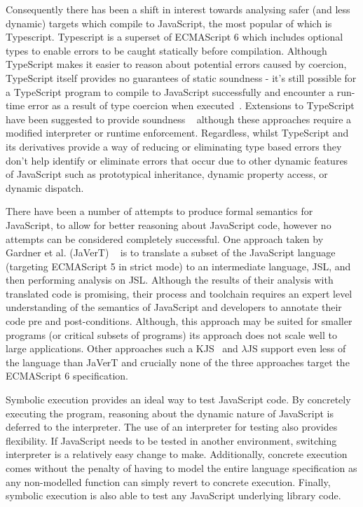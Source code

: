 \documentclass[]{final_report}
\begin{document}
Consequently there has been a shift in interest towards analysing safer (and less dynamic) targets which compile to JavaScript, the most popular of which is Typescript. Typescript is a superset of ECMAScript 6 which includes optional types to enable errors to be caught statically before compilation. Although TypeScript makes it easier to reason about potential errors caused by coercion, TypeScript itself provides no guarantees of static soundness - it's still possible for a TypeScript program to compile to JavaScript successfully and encounter a run-time error as a result of type coercion when executed~\cite{bierman2014understanding}. Extensions to TypeScript have been suggested to provide soundness ~\cite{richards2015concrete, rastogi2015safe} although these approaches require a modified interpreter or runtime enforcement. Regardless, whilst TypeScript and its derivatives provide a way of reducing or eliminating type based errors they don't help identify or eliminate errors that occur due to other dynamic features of JavaScript such as prototypical inheritance, dynamic property access, or dynamic dispatch.

There have been a number of attempts to produce formal semantics for JavaScript, to allow for better reasoning about JavaScript code, however no attempts can be considered completely successful. One approach taken by Gardner et al. (JaVerT) ~\cite{gardner2012towards, guha2010essence} is to translate a subset of the JavaScript language (targeting ECMAScript 5 in strict mode) to an intermediate language, JSL, and then performing analysis on JSL. Although the results of their analysis with translated code is promising, their process and toolchain requires an expert level understanding of the semantics of JavaScript and developers to annotate their code pre and post-conditions. Although, this approach may be suited for smaller programs (or critical subsets of programs) its approach does not scale well to large applications. Other approaches such a KJS~\cite{park2015kjs} and \ensuremath{\lambda}JS\cite{guha2010essence} support even less of the language than JaVerT and crucially none of the three approaches target the ECMAScript 6 specification.

Symbolic execution provides an ideal way to test JavaScript code. By concretely executing the program, reasoning about the dynamic nature of JavaScript is deferred to the interpreter. The use of an interpreter for testing also provides flexibility. If JavaScript needs to be tested in another environment, switching interpreter is a relatively easy change to make. Additionally, concrete execution comes without the penalty of having to model the entire language specification as any non-modelled function can simply revert to concrete execution. Finally, symbolic execution is also able to test any JavaScript underlying library code.
\end{document}
